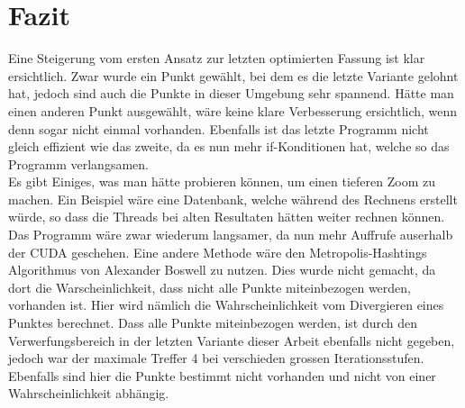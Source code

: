 \section{Fazit}
Eine Steigerung vom ersten Ansatz zur letzten optimierten Fassung ist klar ersichtlich. Zwar wurde ein Punkt gewählt, bei dem es die letzte Variante gelohnt hat, jedoch sind auch die Punkte in dieser Umgebung sehr spannend. Hätte man einen anderen Punkt ausgewählt, wäre keine klare Verbesserung ersichtlich, wenn denn sogar nicht einmal vorhanden. Ebenfalls ist das letzte Programm nicht gleich effizient wie das zweite, da es nun mehr if-Konditionen hat, welche so das Programm verlangsamen.\\
Es gibt Einiges, was man hätte probieren können, um einen tieferen Zoom zu machen. Ein Beispiel wäre eine Datenbank, welche während des Rechnens erstellt würde, so dass die Threads bei alten Resultaten hätten weiter rechnen können. Das Programm wäre zwar wiederum langsamer, da nun mehr Auffrufe auserhalb der CUDA geschehen. Eine andere Methode wäre den Metropolis-Hashtings Algorithmus von Alexander Boswell zu nutzen. Dies wurde nicht gemacht, da dort die Warscheinlichkeit, dass nicht alle Punkte miteinbezogen werden, vorhanden ist. Hier wird nämlich die Wahrscheinlichkeit vom Divergieren eines Punktes berechnet. Dass alle Punkte miteinbezogen werden, ist durch den Verwerfungsbereich in der letzten Variante dieser Arbeit ebenfalls nicht gegeben, jedoch war der maximale Treffer 4 bei verschieden grossen Iterationsstufen. Ebenfalls sind hier die Punkte bestimmt nicht vorhanden und nicht von einer Wahrscheinlichkeit abhängig.